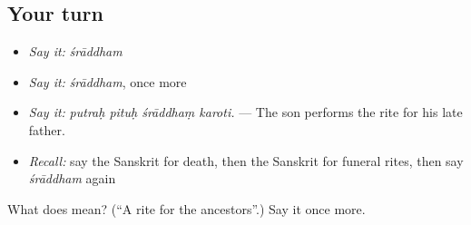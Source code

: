 \subsection*{Your turn}
\begin{itemize}
\raggedright
  \item \emph{Say it:} \emph{śrāddham}
  \item \emph{Say it:} \emph{śrāddham}, once more
  \item \emph{Say it:} \emph{putraḥ pituḥ śrāddhaṃ karoti.} — The son performs the rite for his late father.
  \item \emph{Recall:} say the Sanskrit for death, then the Sanskrit for funeral rites, then say \emph{śrāddham} again
\end{itemize}

\begin{tcolorbox}[breakable,colback=teal!4,colframe=teal!35!black,title={Before you move on}]
What does  mean? (\textquotedblleft{}A rite for the ancestors\textquotedblright{}.) Say it once more.
\end{tcolorbox}
